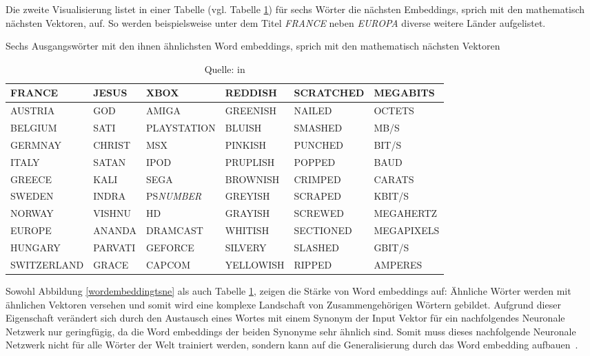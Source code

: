 \documentclass{hwz}
\begin{document}
Die zweite Visualisierung listet in einer Tabelle (vgl. Tabelle \ref{wordembeddingtable}) für sechs Wörter die nächsten Embeddings, sprich mit den mathematisch nächsten Vektoren, auf. So werden beispielsweise unter dem Titel \textit{FRANCE} neben \textit{EUROPA} diverse weitere Länder aufgelistet.
\begin{table}[h]
\centering
    \caption{Sechs Ausgangswörter mit den ihnen ähnlichsten Word embeddings, sprich mit den mathematisch nächsten Vektoren}
    \label{wordembeddingtable}
    \renewcommand{\arraystretch}{1.25}
    \setlength{\tabcolsep}{3pt}
    \small
    \begin{tabular}{ | l | l | l | l | l | l |}
    \hline
    \rowcolor{ccc} FRANCE & JESUS & XBOX & REDDISH & SCRATCHED & MEGABITS \\ \hline
    AUSTRIA & GOD & AMIGA & GREENISH & NAILED & OCTETS \\ \hline
    BELGIUM & SATI & PLAYSTATION & BLUISH & SMASHED & MB/S \\ \hline
    GERMNAY& CHRIST & MSX & PINKISH & PUNCHED & BIT/S \\ \hline
    ITALY & SATAN & IPOD & PRUPLISH & POPPED & BAUD \\ \hline
    GREECE & KALI & SEGA & BROWNISH & CRIMPED & CARATS \\ \hline
    SWEDEN & INDRA & PS\textit{NUMBER} & GREYISH & SCRAPED & KBIT/S \\ \hline
    NORWAY & VISHNU & HD & GRAYISH & SCREWED & MEGAHERTZ \\ \hline
    EUROPE & ANANDA & DRAMCAST & WHITISH & SECTIONED & MEGAPIXELS \\ \hline
    HUNGARY & PARVATI & GEFORCE & SILVERY & SLASHED & GBIT/S \\ \hline
    SWITZERLAND & GRACE & CAPCOM & YELLOWISH & RIPPED & AMPERES \\ \hline
    \end{tabular}
    \caption*{Quelle: \textcite{Collobert2011NaturalScratch} in \textcite{Olah2014DeepRepresentations}}
\end{table}

Sowohl Abbildung \ref{wordembeddingtsne} als auch Tabelle \ref{wordembeddingtable}, zeigen die Stärke von Word embeddings auf: Ähnliche Wörter werden mit ähnlichen Vektoren versehen und somit wird eine komplexe Landschaft von Zusammengehörigen Wörtern gebildet. Aufgrund dieser Eigenschaft verändert sich durch den Austausch eines Wortes mit einem Synonym der Input Vektor für ein nachfolgendes Neuronale Netzwerk nur geringfügig, da die Word embeddings der beiden Synonyme sehr ähnlich sind. Somit muss dieses nachfolgende Neuronale Netzwerk nicht für alle Wörter der Welt trainiert werden, sondern kann auf die Generalisierung durch das Word embedding aufbauen~\autocite{Olah2014DeepRepresentations}.
\end{document}
